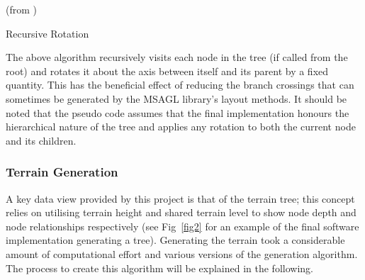 \documentclass[10pt,letterpaper]{article}
\begin{document}
\begin{algorithm}[H]
 
 
 



\BlankLine


\BlankLine

\RecursiveConstantRotate(\RootNode from \TargetTree)\;
\caption{Recursive Rotation}
\end{algorithm}
	
The above algorithm recursively visits each node in the tree (if called from the root) and rotates it about the axis between itself and its parent by a fixed quantity. This has the beneficial effect of reducing the branch crossings that can sometimes be generated by the MSAGL library’s layout methods. It should be noted that the pseudo code assumes that the final implementation honours the hierarchical nature of the tree and applies any rotation to both the current node and its children.

\subsubsection * {Terrain Generation}
A key data view provided by this project is that of the terrain tree; this concept relies on utilising terrain height and shared terrain level to show node depth and node relationships respectively (see Fig~\ref{fig2} for an example of the final software implementation generating a tree). Generating the terrain took a considerable amount of computational effort and various versions of the generation algorithm. The process to create this algorithm will be explained in the following.
\end{document}
